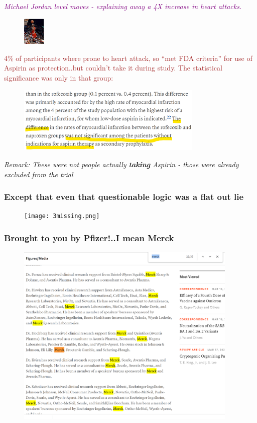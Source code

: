 \documentclass[shadesubsections,compress,14pt,mathserif]{beamer}
\newcommand{\stitle}[1]{{\large{\textcolor{purple}{\emph{#1}}}}}
\begin{document}
\begin{frame}
 \stitle{Michael Jordan level moves - explaining away a 4X increase in heart attacks.}
 \begin{figure}
  \includegraphics[width=30pt]{jordan.png}
\end{figure}
\textcolor{brown}{4\% of participants where prone to heart attack, so ``met FDA criteria'' for use of Aspirin as protection..but couldn't take it during study. The statistical significance was only in that group:}
 \begin{figure}
  \includegraphics[height=90pt]{vioxxfirstsecondtxt.png}
\end{figure}\pause
{\tiny\emph{Remark: These were not people actually \textbf{taking} Aspirin - those were already excluded from the trial}}

 
\end{frame}
\begin{frame}
 \frametitle{Except that even that questionable logic was a flat out \textbf{lie}}\pause
 \begin{figure}
  \texttt{[image: 3missing.png]}
\end{figure}
 
 
 
\end{frame}
\begin{frame}
 \frametitle{Brought to you by Pfizer!..I mean Merck}
 \begin{figure}
  \includegraphics[width=300pt]{merck.png}
\end{figure}
 
\end{frame}
\end{document}
